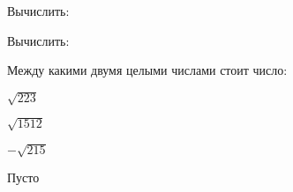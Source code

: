 \begin{class}[number=3]
\begin{listofex}
\begin{enumcols}[itemcolumns=2]
		\end{enumcols}
		\item Вычислить:
		\begin{enumcols}[itemcolumns=3]
			\item {}
			\item {}
			\item {}
			\item {}
			\item {}
			\item {}
		\end{enumcols}
		\item Вычислить:
		\begin{enumcols}[itemcolumns=3]
			\item {}
			\item {}
			\item {}
			\item {}
			\item {}
			\item {}
			\item {}
		\end{enumcols}
		\item Между какими двумя целыми числами стоит число:
		\begin{enumcols}[itemcolumns=3]
			\item \( \sqrt{223} \)
			\item \( \sqrt{1512} \)
			\item \( -\sqrt{215} \)
		\end{enumcols}
	\end{listofex}
\end{class}
%
%
\begin{homework}[number=1]
	\begin{listofex}
		\item Пусто
	\end{listofex}
\end{homework}
%

